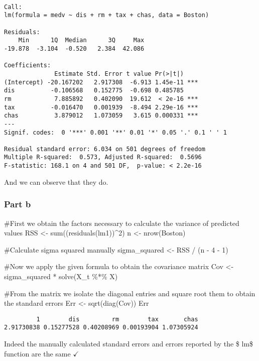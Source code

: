 \documentclass[
  letterpaper,
  DIV=11,
  numbers=noendperiod]{scrartcl}
\newenvironment{Shaded}{\begin{snugshade}}{\end{snugshade}}
\newcommand{\CommentTok}[1]{\textcolor[rgb]{0.37,0.37,0.37}{#1}}
\newcommand{\DecValTok}[1]{\textcolor[rgb]{0.68,0.00,0.00}{#1}}
\newcommand{\FunctionTok}[1]{\textcolor[rgb]{0.28,0.35,0.67}{#1}}
\newcommand{\NormalTok}[1]{\textcolor[rgb]{0.00,0.23,0.31}{#1}}
\newcommand{\OtherTok}[1]{\textcolor[rgb]{0.00,0.23,0.31}{#1}}
\newcommand{\SpecialCharTok}[1]{\textcolor[rgb]{0.37,0.37,0.37}{#1}}
\begin{document}
\begin{verbatim}

Call:
lm(formula = medv ~ dis + rm + tax + chas, data = Boston)

Residuals:
    Min      1Q  Median      3Q     Max 
-19.878  -3.104  -0.520   2.384  42.086 

Coefficients:
              Estimate Std. Error t value Pr(>|t|)    
(Intercept) -20.167202   2.917308  -6.913 1.45e-11 ***
dis          -0.106568   0.152775  -0.698 0.485785    
rm            7.885892   0.402090  19.612  < 2e-16 ***
tax          -0.016470   0.001939  -8.494 2.29e-16 ***
chas          3.879012   1.073059   3.615 0.000331 ***
---
Signif. codes:  0 '***' 0.001 '**' 0.01 '*' 0.05 '.' 0.1 ' ' 1

Residual standard error: 6.034 on 501 degrees of freedom
Multiple R-squared:  0.573, Adjusted R-squared:  0.5696 
F-statistic: 168.1 on 4 and 501 DF,  p-value: < 2.2e-16
\end{verbatim}

And we can observe that they do.

\hypertarget{part-b}{%
\subsubsection{Part b}\label{part-b}}

\begin{Shaded}
\begin{Highlighting}[]
\CommentTok{\#First we obtain the factors necessary to calculate the variance of predicted values}
\NormalTok{RSS }\OtherTok{\textless{}{-}} \FunctionTok{sum}\NormalTok{((}\FunctionTok{residuals}\NormalTok{(lm1))}\SpecialCharTok{\^{}}\DecValTok{2}\NormalTok{)}
\NormalTok{n }\OtherTok{\textless{}{-}} \FunctionTok{nrow}\NormalTok{(Boston)}

\CommentTok{\#Calculate sigma squared manually}
\NormalTok{sigma\_squared }\OtherTok{\textless{}{-}}\NormalTok{ RSS }\SpecialCharTok{/}\NormalTok{ (n }\SpecialCharTok{{-}} \DecValTok{4} \SpecialCharTok{{-}} \DecValTok{1}\NormalTok{)}

\CommentTok{\#Now we apply the given formula to obtain the covariance matrix}
\NormalTok{Cov }\OtherTok{\textless{}{-}}\NormalTok{ sigma\_squared }\SpecialCharTok{*} \FunctionTok{solve}\NormalTok{(X\_t }\SpecialCharTok{\%*\%}\NormalTok{ X)}

\CommentTok{\#From the matrix we isolate the diagonal entries and square root them to obtain the standard errors}
\NormalTok{Err }\OtherTok{\textless{}{-}} \FunctionTok{sqrt}\NormalTok{(}\FunctionTok{diag}\NormalTok{(Cov))}
\NormalTok{Err}
\end{Highlighting}
\end{Shaded}

\begin{verbatim}
         1        dis         rm        tax       chas 
2.91730838 0.15277528 0.40208969 0.00193904 1.07305924 
\end{verbatim}

Indeed the manually calculated standard errors and errors reported by
the \$ lm\$ function are the same \(\checkmark\)
\end{document}
